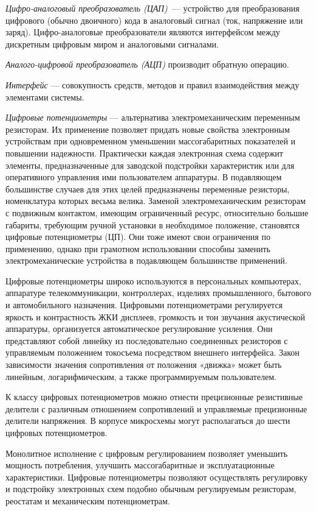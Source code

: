 \textit{Цифро-аналоговый преобразователь (ЦАП)}~--- устройство для преобразования цифрового (обычно двоичного) кода в аналоговый сигнал (ток, напряжение или заряд). Цифро-аналоговые преобразователи являются интерфейсом между дискретным цифровым миром и аналоговыми сигналами.

\textit{Аналого-цифровой преобразователь (АЦП)} производит обратную операцию.

\textit{Интерфейс} --- совокупность средств, методов и правил взаимодействия между элементами системы.

\textit{Цифровые потенциометры} --- альтернатива электромеханическим переменным резисторам. Их применение позволяет придать новые свойства электронным устройствам при одновременном уменьшении массогабаритных показателей и повышении надежности. Практически каждая электронная схема содержит элементы, предназначенные для заводской подстройки характеристик или для оперативного управления ими пользователем аппаратуры. В подавляющем большинстве случаев для этих целей предназначены переменные резисторы, номенклатура которых весьма велика. Заменой электромеханическим резисторам с подвижным контактом, имеющим ограниченный ресурс, относительно большие габариты, требующим ручной установки в необходимое положение, становятся цифровые потенциометры (ЦП). Они тоже имеют свои ограничения по применению, однако при грамотном использовании способны заменить электромеханические устройства в подавляющем большинстве применений.

Цифровые потенциометры широко используются в персональных компьютерах, аппаратуре телекоммуникации, контроллерах, изделиях промышленного, бытового и автомобильного назначения. Цифровыми потенциометрами регулируется яркость и контрастность ЖКИ дисплеев, громкость и тон звучания акустической аппаратуры, организуется автоматическое регулирование усиления. Они представляют собой линейку из последовательно соединенных резисторов с управляемым положением токосъема посредством внешнего интерфейса. Закон зависимости значения сопротивления от положения «движка» может быть линейным, логарифмическим, а также программируемым пользователем.

К классу цифровых потенциометров можно отнести прецизионные резистивные делители с различным отношением сопротивлений и управляемые прецизионные делители напряжения. В корпусе микросхемы могут располагаться до шести цифровых потенциометров. 

Монолитное исполнение с цифровым регулированием позволяет уменьшить мощность потребления, улучшить массогабаритные и эксплуатационные характеристики. Цифровые потенциометры позволяют осуществлять регулировку и подстройку электронных схем подобно обычным регулируемым резисторам, реостатам и механическим потенциометрам. 

